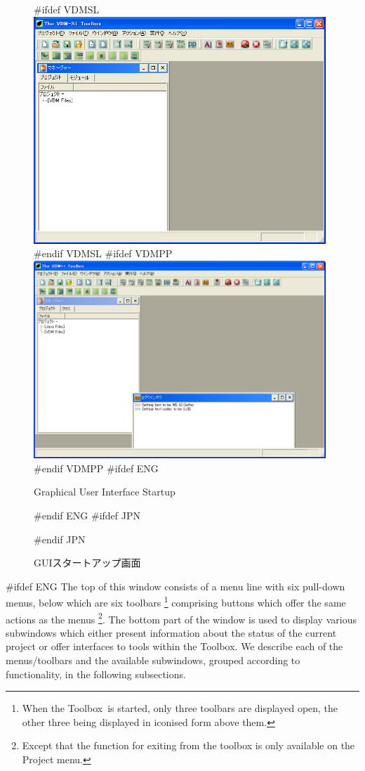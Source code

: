 \documentclass[\pformat,12pt]{article}
\newcommand{\Toolbox}{Toolbox}
\newcommand{\Toolbox}{Toolbox}
\newcommand{\guicmd}[1]{{\sf #1}}
\newcommand{\guicmd}[1]{{\gt #1}}
\begin{document}
\begin{figure}[tbh]
\begin{center}
#ifdef VDMSL
\includegraphics[width=11cm]{startgui-sl.png}
#endif VDMSL
#ifdef VDMPP
\includegraphics[width=11cm]{startgui-pp.png}
#endif VDMPP
#ifdef ENG
\caption{Graphical User Interface Startup}
#endif ENG
#ifdef JPN
\caption{GUIスタートアップ画面}
#endif JPN
\label{fig:startgui2}
\end{center}
\end{figure}

#ifdef ENG
The top of this window consists of a menu line with six pull-down
menus, below which are six toolbars \footnote{When the \Toolbox\ is
  started, only three toolbars are displayed open, the other three
  being displayed in iconised form above them.} comprising buttons
which offer the same actions as the menus \footnote{Except that the
  function for exiting from the toolbox is only available on the
  \guicmd{Project} menu.}. The bottom part of the window is used to
display various subwindows which either present information about the
status of the current project or offer interfaces to tools within the
\Toolbox. We describe each of the menus/toolbars and the available
subwindows, grouped according to functionality, in the following
subsections.
\end{document}
